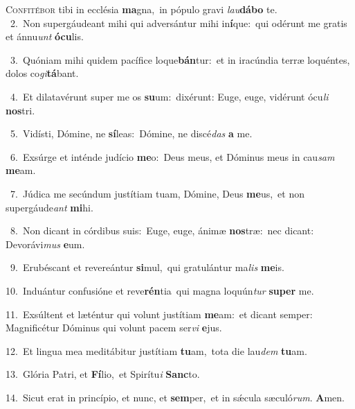\lettrine{\initial\textcolor{\initialcolor}{C}}{onfitébor} tibi in ecclésia \textbf{ma}\-gna,~\star in pópulo gravi \textit{lau}\-\textbf{dá}\textbf{bo} te.\\
{\numbfont\textcolor{\numbcolor}{~2.}}~Non supergáudeant mihi qui adversántur mihi in\-\textbf{í}\-que:~\star qui odérunt me gratis et ánnu\textit{unt} \textbf{ó}\-\textbf{cu}lis.\par
{\numbfont\textcolor{\numbcolor}{~3.}}~Quóniam mihi quidem pacífice loque\-\textbf{bán}\-tur:~\star et in iracúndia terræ loquéntes, dolos co\-\textit{gi}\-\textbf{tá}bant.\par
{\numbfont\textcolor{\numbcolor}{~4.}}~Et dilatavérunt super me os \textbf{su}\-um:~\star dixérunt: Euge, euge, vidérunt ócu\textit{li} \textbf{nos}\-tri.\par
{\numbfont\textcolor{\numbcolor}{~5.}}~Vidísti, Dómine, ne \textbf{sí}\-leas:~\star Dómine, ne discé\textit{das} \textbf{a} me.\par
{\numbfont\textcolor{\numbcolor}{~6.}}~Exsúrge et inténde judício \textbf{me}\-o:~\star Deus meus, et Dóminus meus in cau\textit{sam} \textbf{me}\-am.\par
{\numbfont\textcolor{\numbcolor}{~7.}}~Júdica me secúndum justítiam tuam, Dómine, Deus \textbf{me}\-us,~\star et non supergáude\textit{ant} \textbf{mi}\-hi.\par
{\numbfont\textcolor{\numbcolor}{~8.}}~Non dicant in córdibus suis:~\dagger Euge, euge, ánimæ \textbf{nos}\-træ:~\star nec dicant: Devorávi\textit{mus} \textbf{e}\-um.\par
{\numbfont\textcolor{\numbcolor}{~9.}}~Erubéscant et revereántur \textbf{si}\-mul,~\star qui gratulántur ma\textit{lis} \textbf{me}\-is.\par
{\numbfont\textcolor{\numbcolor}{10.}}~Induántur confusióne et reve\-\textbf{rén}\-tia~\star qui magna loquún\textit{tur} \textbf{su}\-\textbf{per} me.\par
{\numbfont\textcolor{\numbcolor}{11.}}~Exsúltent et læténtur qui volunt justítiam \textbf{me}\-am:~\star et dicant semper: Magnificétur Dóminus qui volunt pacem ser\textit{vi} \textbf{e}\-jus.\par
{\numbfont\textcolor{\numbcolor}{12.}}~Et lingua mea meditábitur justítiam \textbf{tu}\-am,~\star tota die lau\textit{dem} \textbf{tu}\-am.\par
{\numbfont\textcolor{\numbcolor}{13.}}~Glória Patri, et \textbf{Fí}\-lio,~\star et Spirítu\textit{i} \textbf{Sanc}\-to.\par
{\numbfont\textcolor{\numbcolor}{14.}}~Sicut erat in princípio, et nunc, et \textbf{sem}\-per,~\star et in sǽcula sæculó\-\textit{rum}\-. \textbf{A}\-men.\par
